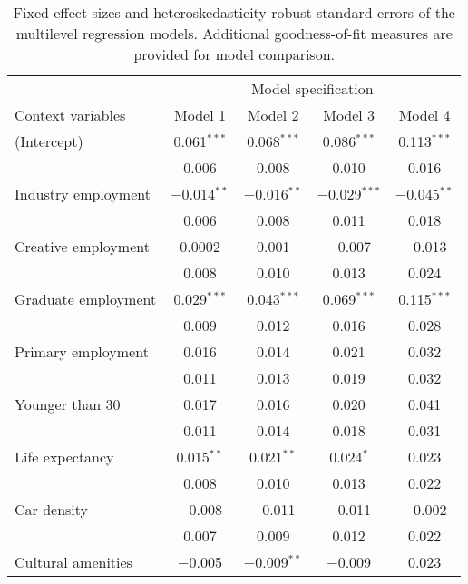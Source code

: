 \begin{table}

\caption[Fixed effects of the multilevel regression models]{Fixed effect sizes and heteroskedasticity-robust standard errors of the multilevel regression models. Additional goodness-of-fit measures are provided for model comparison.}
\centering
\begin{tabular}[t]{lcccc}
\toprule
\multicolumn{1}{c}{ } & \multicolumn{4}{c}{Model specification} \\
\cmidrule(l{3pt}r{3pt}){2-5}
Context variables & Model 1 & Model 2 & Model 3 & Model 4\\
\midrule
(Intercept) & \num{0.061}$^{***}$ & \num{0.068}$^{***}$ & \num{0.086}$^{***}$ & \num{0.113}$^{***}$\\
 & \num{0.006} & \num{0.008} & \num{0.010} & \num{0.016}\\
Industry employment & \num{-0.014}$^{**}$ & \num{-0.016}$^{**}$ & \num{-0.029}$^{***}$ & \num{-0.045}$^{**}$\\
 & \num{0.006} & \num{0.008} & \num{0.011} & \num{0.018}\\
Creative employment & \num{0.0002} & \num{0.001} & \num{-0.007} & \num{-0.013}\\
 & \num{0.008} & \num{0.010} & \num{0.013} & \num{0.024}\\
Graduate employment & \num{0.029}$^{***}$ & \num{0.043}$^{***}$ & \num{0.069}$^{***}$ & \num{0.115}$^{***}$\\
 & \num{0.009} & \num{0.012} & \num{0.016} & \num{0.028}\\
Primary employment & \num{0.016} & \num{0.014} & \num{0.021} & \num{0.032}\\
 & \num{0.011} & \num{0.013} & \num{0.019} & \num{0.032}\\
Younger than 30 & \num{0.017} & \num{0.016} & \num{0.020} & \num{0.041}\\
 & \num{0.011} & \num{0.014} & \num{0.018} & \num{0.031}\\
Life expectancy & \num{0.015}$^{**}$ & \num{0.021}$^{**}$ & \num{0.024}$^{*}$ & \num{0.023}\\
 & \num{0.008} & \num{0.010} & \num{0.013} & \num{0.022}\\
Car density & \num{-0.008} & \num{-0.011} & \num{-0.011} & \num{-0.002}\\
 & \num{0.007} & \num{0.009} & \num{0.012} & \num{0.022}\\
Cultural amenities & \num{-0.005} & \num{-0.009}$^{**}$ & \num{-0.009} & \num{0.023}\\

\end{tabular}
\end{table}
